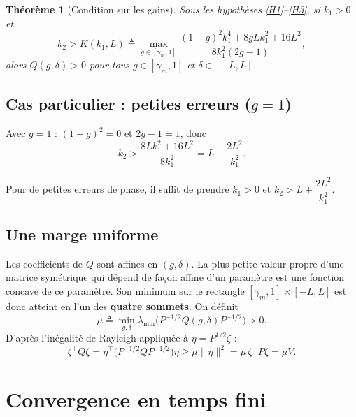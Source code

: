 \documentclass[11pt,a4paper]{article}
\numberwithin{equation}{section}
\theoremstyle{plain}
\newtheorem{theoreme}{Théorème}[section]
\theoremstyle{definition}
\theoremstyle{remark}
\begin{document}
\begin{theoreme}[Condition sur les gains]\label{thm:gains}
Sous les hypothèses \ref{H1}--\ref{H3}, si $k_1>0$ et
\begin{equation}\label{eq:k2cond}
\boxed{k_2 > K(k_1,L) \triangleq \max_{g\in[\gamma_m,1]}\frac{(1-g)^2k_1^4 + 8gLk_1^2 + 16L^2}{8k_1^2(2g-1)},}
\end{equation}
alors $Q(g,\delta)>0$ pour tous $g\in[\gamma_m,1]$ et $\delta\in[-L,L]$.
\end{theoreme}

\subsection{Cas particulier : petites erreurs ($g=1$)}
Avec $g=1$ : $(1-g)^2=0$ et $2g-1=1$, donc
\begin{equation}
k_2 > \frac{8Lk_1^2+16L^2}{8k_1^2} = L + \frac{2L^2}{k_1^2}.
\end{equation}
\begin{resultat}
Pour de petites erreurs de phase, il suffit de prendre $k_1>0$ et $k_2 > L + \dfrac{2L^2}{k_1^2}$.
\end{resultat}

\subsection{Une marge uniforme}
Les coefficients de $Q$ sont affines en $(g,\delta)$. La plus petite valeur propre d'une matrice
symétrique qui dépend de façon affine d'un paramètre est une fonction concave de ce paramètre.
Son minimum sur le rectangle $[\gamma_m,1]\times[-L,L]$ est donc atteint en l'un des
\textbf{quatre sommets}. On définit
\begin{equation}\label{eq:mu}
\mu \triangleq \min_{g,\delta}\lambda_{\min}\!\big(P^{-1/2}Q(g,\delta)P^{-1/2}\big) > 0 .
\end{equation}
D'après l'inégalité de Rayleigh appliquée à $\eta=P^{1/2}\zeta$ :
\begin{equation}\label{eq:QmuP}
\zeta^\top Q\zeta = \eta^\top\big(P^{-1/2}QP^{-1/2}\big)\eta \ge \mu\|\eta\|^2 = \mu\,\zeta^\top P\zeta = \mu V .
\end{equation}

\section{Convergence en temps fini}\label{sec:temps}
\end{document}

